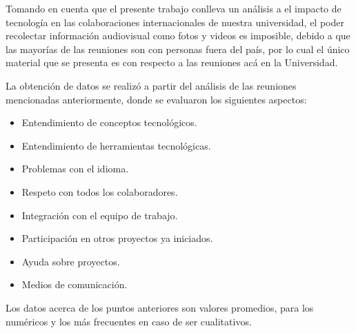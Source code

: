 %
%
%
%
Tomando en cuenta que el presente trabajo conlleva un análisis a el impacto de tecnología
en las colaboraciones internacionales de nuestra universidad, el poder recolectar información
audiovisual como fotos y videos es imposible, debido a que las mayorías de las reuniones son
con personas fuera del país, por lo cual el único material que se presenta es con respecto a
las reuniones acá en la Universidad.

La obtención de datos se realizó a partir del análisis de las reuniones mencionadas anteriormente,
donde se evaluaron los siguientes aspectos:
\begin{itemize}
	\item Entendimiento de conceptos tecnológicos.
	\item Entendimiento de herramientas tecnológicas.
	\item Problemas con el idioma.
	\item Respeto con todos los colaboradores.
	\item Integración con el equipo de trabajo.
	\item Participación en otros proyectos ya iniciados.
	\item Ayuda sobre proyectos.
	\item Medios de comunicación.
\end{itemize}

Los datos acerca de los puntos anteriores son valores promedios, para los numéricos
y los más frecuentes en caso de ser cualitativos.

